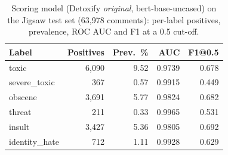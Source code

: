\begin{table}[!t]
\caption{Scoring model (Detoxify \emph{original}, bert-base-uncased) on the Jigsaw test set (63,978 comments):
per-label positives, prevalence, ROC AUC and F1 at a 0.5 cut-off.}
\label{tab:jigsaw-model}
\centering\footnotesize
\begin{tabular}{@{}lrrrr@{}}
\toprule
\textbf{Label} & \textbf{Positives} & \textbf{Prev.\ \%} & \textbf{AUC} & \textbf{F1@0.5} \\
\midrule
toxic & 6,090 & 9.52 & 0.9739 & 0.678 \\
severe\_toxic & 367 & 0.57 & 0.9915 & 0.449 \\
obscene & 3,691 & 5.77 & 0.9824 & 0.682 \\
threat & 211 & 0.33 & 0.9965 & 0.531 \\
insult & 3,427 & 5.36 & 0.9805 & 0.692 \\
identity\_hate & 712 & 1.11 & 0.9928 & 0.629 \\
\bottomrule
\end{tabular}
\end{table}
